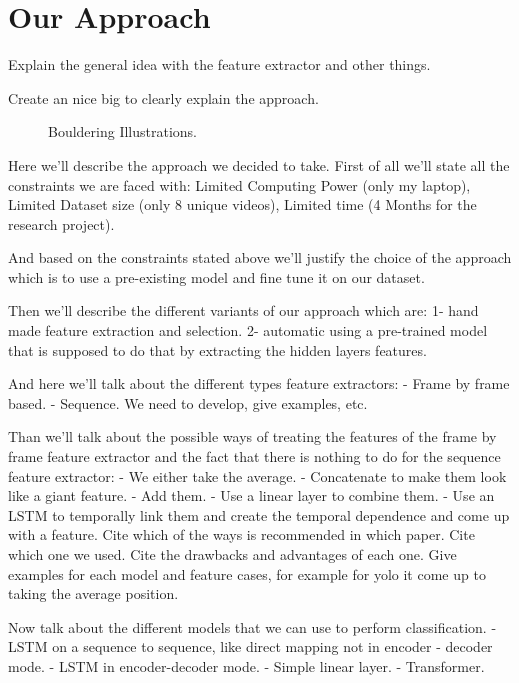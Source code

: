 \section{Our Approach}

Explain the general idea with the feature extractor and other things.

Create an nice big to clearly explain the approach.

\begin{figure*}[h]
    \centering
    \caption{Bouldering Illustrations.}
\end{figure*}

Here we'll describe the approach we decided to take. First of all we'll state all the constraints we are faced with: Limited Computing Power (only my laptop), Limited Dataset size (only 8 unique videos), Limited time (4 Months for the research project).

And based on the constraints stated above we'll justify the choice of the approach which is to use a pre-existing model and fine tune it on our dataset.

Then we'll describe the different variants of our approach which are:
1- hand made feature extraction and selection.
2- automatic using a pre-trained model that is supposed to do that by extracting the hidden layers features.

And here we'll talk about the different types feature extractors:
- Frame by frame based.
- Sequence.
We need to develop, give examples, etc.

Than we'll talk about the possible ways of treating the features of the frame by frame feature extractor and the fact that there is nothing to do for the sequence feature extractor:
- We either take the average.
- Concatenate to make them look like a giant feature.
- Add them.
- Use a linear layer to combine them.
- Use an LSTM to temporally link them and create the temporal dependence and come up with a feature.
Cite which of the ways is recommended in which paper. Cite which one we used. Cite the drawbacks and advantages of each one.
Give examples for each model and feature cases, for example for yolo it come up to taking the average position.

Now talk about the different models that we can use to perform classification.
- LSTM on a sequence to sequence, like direct mapping not in encoder - decoder mode.
- LSTM in encoder-decoder mode.
- Simple linear layer.
- Transformer.

